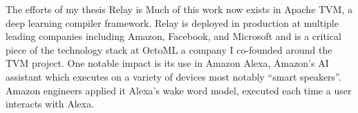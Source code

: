 \begin{fullwidth}
\begin{center}
The efforts of my thesis Relay is
Much of this work now exists in Apache TVM, a deep learning compiler framework.
Relay is deployed in production at multiple leading companies including
  Amazon, Facebook, and Microsoft and is a critical piece of the technology stack
  at OctoML a company I co-founded around the TVM project.
One notable impact is its use in Amazon Alexa, Amazon's AI assistant
  which executes on a variety of devices most notably ``smart speakers''.
Amazon engineers applied it Alexa’s wake word model, executed each time a user interacts with
  Alexa.

\end{center}
\end{fullwidth}
